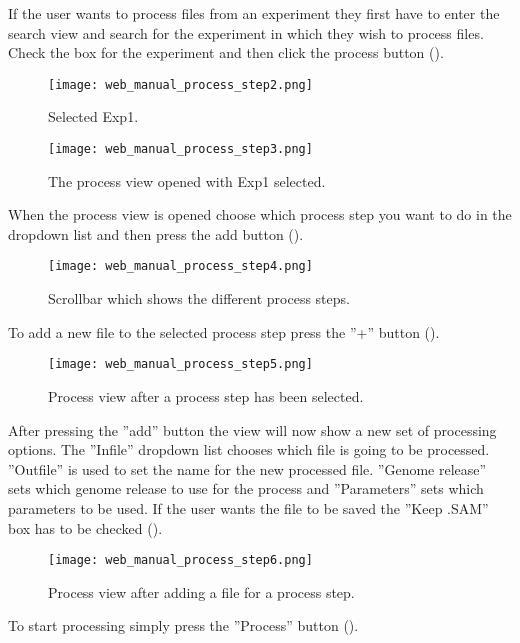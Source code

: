 If the user wants to process files from an experiment they first have to enter the search view and search for the experiment in which they wish to process files. Check the box for the experiment and then click the process button ().
\begin{figure}[h!]
\centering
\texttt{[image: web\_manual\_process\_step2.png]}
\caption{\label{fig:web_process_step1}Selected Exp1.}
\end{figure}
\begin{figure}[h!]
\centering
\texttt{[image: web\_manual\_process\_step3.png]}
\caption{\label{fig:web_process_step2}The process view opened with Exp1 selected.}
\end{figure}
When the process view is opened choose which process step you want to do in the dropdown list and then press the add button ().
\begin{figure}[h!]
\centering
\texttt{[image: web\_manual\_process\_step4.png]}
\caption{\label{fig:web_process_step3}Scrollbar which shows the different process steps.}
\end{figure}
To add a new file to the selected process step press the ''+''
 button ().
 \begin{figure}[h!]
\centering
\texttt{[image: web\_manual\_process\_step5.png]}
\caption{\label{fig:web_process_step4}Process view after a process step has been selected.}
\end{figure}
After pressing the ''add'' button the view will now show a new set of processing options. The ''Infile'' dropdown list chooses which file is going to be processed. ''Outfile'' is used to set the name for the new processed file. ''Genome release'' sets which genome release to use for the process and ''Parameters'' sets which parameters to be used. If the user wants the  file to be saved the ''Keep .SAM'' box has to be checked ().
\begin{figure}[h]
\centering
\texttt{[image: web\_manual\_process\_step6.png]}
\caption{\label{fig:web_process_step5}Process view after adding a file for a process step.}
\end{figure}
To start processing simply press the ''Process'' button ().



\pagebreak



